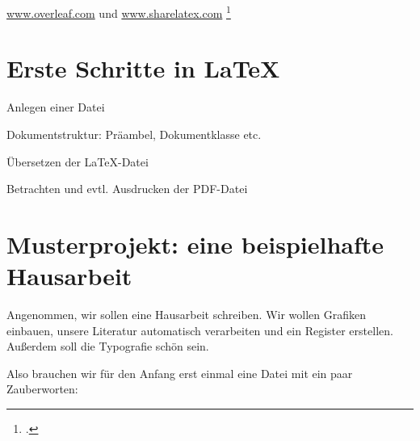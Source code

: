 \url{www.overleaf.com}  und \url{www.sharelatex.com} 
\footcite{meyer:dtk2015/1}



\section{Erste Schritte in \LaTeX}

Anlegen einer Datei

Dokumentstruktur: Präambel, Dokumentklasse etc.

Übersetzen der \LaTeX{}-Datei

Betrachten und evtl. Ausdrucken der PDF-Datei


\section{Musterprojekt: eine beispielhafte Hausarbeit}

Angenommen, wir sollen eine Hausarbeit schreiben.
Wir wollen Grafiken einbauen, unsere Literatur automatisch verarbeiten und ein Register erstellen.
Außerdem soll die Typografie schön sein.

Also brauchen wir für den Anfang erst einmal eine Datei mit ein paar Zauberworten:




